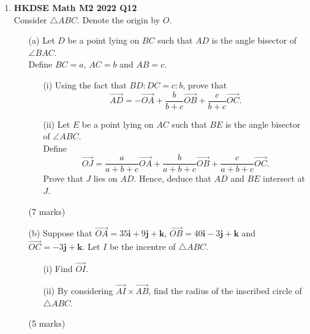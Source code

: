 \documentclass{report}
\begin{document}
\begin{enumerate}
	\item \textbf{HKDSE Math M2 2022 Q12}\\
	Consider $\triangle ABC$. Denote the origin by $O$. 
	\begin{enumerate}
		\item [(a)]Let $D$ be a point lying on $BC$ such that $AD$ is the angle bisector of $\angle BAC$. \\
		Define $BC = a$, $AC = b$  and  $AB = c$. 
		\begin{enumerate}
			\item [(i)]Using the fact that $BD:DC = c:b$, prove that $$\overrightarrow{AD} = -\overrightarrow{OA}+\displaystyle\frac{b}{b+c}\overrightarrow{OB} + \displaystyle\frac{c}{b+c}\overrightarrow{OC}.$$
			\item [(ii)]Let $E$ be a point lying on $AC$ such that $BE$ is the angle bisector of $\angle ABC$. \\
			Define $$\overrightarrow{OJ} = \displaystyle\frac{a}{a+b+c}\overrightarrow{OA}+\displaystyle\frac{b}{a+b+c}\overrightarrow{OB}+\displaystyle\frac{c}{a+b+c}\overrightarrow{OC}.$$
				Prove that $J$ lies on $AD$. Hence, deduce that $AD$ and $BE$ intersect at $J$.
		\end{enumerate}
		(7 marks)
		\item [(b)]Suppose that $\overrightarrow{OA} = 35\textbf{i} +9 \textbf{j}+ \textbf {k}$, $\overrightarrow{OB} = 40\textbf{i} -3 \textbf{j}+ \textbf {k}$ and $\overrightarrow{OC} =  -3 \textbf{j}+ \textbf {k}$. Let $I$ be the incentre of $\triangle ABC$. 
		\begin{enumerate}
			\item [(i)] Find $\overrightarrow{OI}$. 
			\item [(ii)] By considering $\overrightarrow{AI} \times \overrightarrow{AB}$, find the radius of the inscribed circle of $\triangle ABC$. 
		\end{enumerate}
		(5 marks)
	\end{enumerate}            


\end{enumerate}
\end{document}
